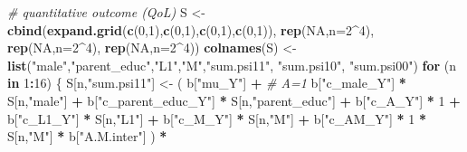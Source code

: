 \documentclass[
]{book}
\newenvironment{Shaded}{\begin{snugshade}}{\end{snugshade}}
\newcommand{\AttributeTok}[1]{\textcolor[rgb]{0.13,0.29,0.53}{#1}}
\newcommand{\CommentTok}[1]{\textcolor[rgb]{0.56,0.35,0.01}{\textit{#1}}}
\newcommand{\ConstantTok}[1]{\textcolor[rgb]{0.56,0.35,0.01}{#1}}
\newcommand{\ControlFlowTok}[1]{\textcolor[rgb]{0.13,0.29,0.53}{\textbf{#1}}}
\newcommand{\DecValTok}[1]{\textcolor[rgb]{0.00,0.00,0.81}{#1}}
\newcommand{\FunctionTok}[1]{\textcolor[rgb]{0.13,0.29,0.53}{\textbf{#1}}}
\newcommand{\NormalTok}[1]{#1}
\newcommand{\OtherTok}[1]{\textcolor[rgb]{0.56,0.35,0.01}{#1}}
\newcommand{\SpecialCharTok}[1]{\textcolor[rgb]{0.81,0.36,0.00}{\textbf{#1}}}
\newcommand{\StringTok}[1]{\textcolor[rgb]{0.31,0.60,0.02}{#1}}
\begin{document}
\begin{Shaded}
\begin{Highlighting}[]
  \CommentTok{\# quantitative outcome (QoL)}
\NormalTok{  S }\OtherTok{\textless{}{-}} \FunctionTok{cbind}\NormalTok{(}\FunctionTok{expand.grid}\NormalTok{(}\FunctionTok{c}\NormalTok{(}\DecValTok{0}\NormalTok{,}\DecValTok{1}\NormalTok{),}\FunctionTok{c}\NormalTok{(}\DecValTok{0}\NormalTok{,}\DecValTok{1}\NormalTok{),}\FunctionTok{c}\NormalTok{(}\DecValTok{0}\NormalTok{,}\DecValTok{1}\NormalTok{),}\FunctionTok{c}\NormalTok{(}\DecValTok{0}\NormalTok{,}\DecValTok{1}\NormalTok{)), }\FunctionTok{rep}\NormalTok{(}\ConstantTok{NA}\NormalTok{,}\AttributeTok{n=}\DecValTok{2}\SpecialCharTok{\^{}}\DecValTok{4}\NormalTok{), }
             \FunctionTok{rep}\NormalTok{(}\ConstantTok{NA}\NormalTok{,}\AttributeTok{n=}\DecValTok{2}\SpecialCharTok{\^{}}\DecValTok{4}\NormalTok{), }\FunctionTok{rep}\NormalTok{(}\ConstantTok{NA}\NormalTok{,}\AttributeTok{n=}\DecValTok{2}\SpecialCharTok{\^{}}\DecValTok{4}\NormalTok{))}
  \FunctionTok{colnames}\NormalTok{(S) }\OtherTok{\textless{}{-}} \FunctionTok{list}\NormalTok{(}\StringTok{"male"}\NormalTok{,}\StringTok{"parent\_educ"}\NormalTok{,}\StringTok{"L1"}\NormalTok{,}\StringTok{"M"}\NormalTok{,}\StringTok{"sum.psi11"}\NormalTok{, }\StringTok{"sum.psi10"}\NormalTok{, }
                      \StringTok{"sum.psi00"}\NormalTok{)}
  \ControlFlowTok{for}\NormalTok{ (n }\ControlFlowTok{in} \DecValTok{1}\SpecialCharTok{:}\DecValTok{16}\NormalTok{) \{}
\NormalTok{    S[n,}\StringTok{"sum.psi11"}\NormalTok{] }\OtherTok{\textless{}{-}}\NormalTok{  ( b[}\StringTok{"mu\_Y"}\NormalTok{] }\SpecialCharTok{+}                                          \CommentTok{\# A=1}
\NormalTok{                             b[}\StringTok{"c\_male\_Y"}\NormalTok{] }\SpecialCharTok{*}\NormalTok{ S[n,}\StringTok{"male"}\NormalTok{] }\SpecialCharTok{+} 
\NormalTok{                             b[}\StringTok{"c\_parent\_educ\_Y"}\NormalTok{] }\SpecialCharTok{*}\NormalTok{ S[n,}\StringTok{"parent\_educ"}\NormalTok{] }\SpecialCharTok{+} 
\NormalTok{                             b[}\StringTok{"c\_A\_Y"}\NormalTok{] }\SpecialCharTok{*} \DecValTok{1} \SpecialCharTok{+} 
\NormalTok{                             b[}\StringTok{"c\_L1\_Y"}\NormalTok{] }\SpecialCharTok{*}\NormalTok{ S[n,}\StringTok{"L1"}\NormalTok{] }\SpecialCharTok{+}
\NormalTok{                             b[}\StringTok{"c\_M\_Y"}\NormalTok{] }\SpecialCharTok{*}\NormalTok{ S[n,}\StringTok{"M"}\NormalTok{] }\SpecialCharTok{+}
\NormalTok{                             b[}\StringTok{"c\_AM\_Y"}\NormalTok{] }\SpecialCharTok{*} \DecValTok{1} \SpecialCharTok{*}\NormalTok{ S[n,}\StringTok{"M"}\NormalTok{] }\SpecialCharTok{*}\NormalTok{ b[}\StringTok{"A.M.inter"}\NormalTok{] ) }\SpecialCharTok{*}

\end{Highlighting}
\end{Shaded}
\end{document}
